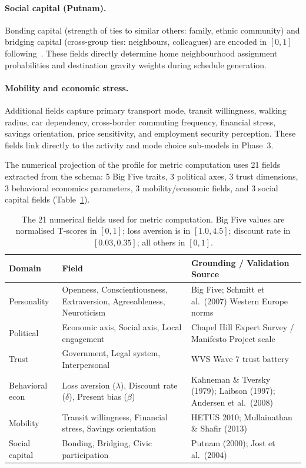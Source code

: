 \documentclass[sustainability,article,submit,pdftex,moreauthors]{Definitions/mdpi}
\begin{document}
\paragraph{Social capital (Putnam).}
Bonding capital (strength of ties to similar others: family, ethnic
community) and bridging capital (cross-group ties: neighbours, colleagues)
are encoded in $[0,1]$ following~\cite{putnam2000bowling}. These fields
directly determine home neighbourhood assignment probabilities and
destination gravity weights during schedule generation.

\paragraph{Mobility and economic stress.}
Additional fields capture primary transport mode, transit willingness,
walking radius, car dependency, cross-border commuting frequency, financial
stress, savings orientation, price sensitivity, and employment security
perception. These fields link directly to the activity and mode choice
sub-models in Phase~3.

The numerical projection of the profile for metric computation uses 21
fields extracted from the schema: 5 Big Five traits, 3 political axes,
3 trust dimensions, 3 behavioral economics parameters, 3 mobility/economic
fields, and 3 social capital fields (Table~\ref{tab:schema_fields}).

\begin{table}[H]
\caption{The 21 numerical fields used for metric computation.
Big Five values are normalised T-scores in $[0,1]$; loss aversion is
in $[1.0, 4.5]$; discount rate in $[0.03, 0.35]$; all others in $[0,1]$.}
\label{tab:schema_fields}
\begin{tabularx}{\textwidth}{p{3.2cm}p{4.5cm}X}
\toprule
\textbf{Domain} & \textbf{Field} & \textbf{Grounding / Validation Source} \\
\midrule
Personality     & Openness, Conscientiousness, Extraversion, Agreeableness, Neuroticism
                & Big Five; Schmitt et al.\ (2007) Western Europe norms \\
Political       & Economic axis, Social axis, Local engagement
                & Chapel Hill Expert Survey / Manifesto Project scale \\
Trust           & Government, Legal system, Interpersonal
                & WVS Wave 7 trust battery \\
Behavioral econ & Loss aversion ($\lambda$), Discount rate ($\delta$), Present bias ($\beta$)
                & Kahneman \& Tversky (1979); Laibson (1997); Andersen et al.\ (2008) \\
Mobility        & Transit willingness, Financial stress, Savings orientation
                & HETUS 2010; Mullainathan \& Shafir (2013) \\
Social capital  & Bonding, Bridging, Civic participation
                & Putnam (2000); Jost et al.\ (2004) \\
\bottomrule
\end{tabularx}
\end{table}
\end{document}
